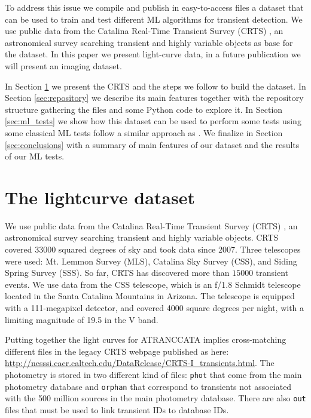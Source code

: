 \documentclass[a4paper,fleqn,usenatbib]{mnras}
\begin{document}
To address this issue we compile and publish in easy-to-access files a
dataset that can be used to train and test different ML algorithms for
transient detection.
We use public data from the Catalina Real-Time Transient Survey
(CRTS) \citep{1111.2566}, an astronomical survey searching transient
and highly variable objects as base for the dataset.
In this paper we present light-curve data, in a future publication we
will present an imaging dataset. 

In Section \ref{sec:data} we present the CRTS and the steps we follow
to build the dataset.
In Section \ref{sec:repository} we describe its main features together
with the repository structure gathering the files and some Python code  
to explore it.
In Section \ref{sec:ml_tests} we show how this dataset can be used to
perform some tests using some classical ML tests follow a similar
approach as \cite{1601.03931}.  
We finalize in Section \ref{sec:conclusions} with a summary of main
features of our dataset and the results of our ML tests.

\section{The lightcurve dataset} 
\label{sec:data}

We use public data from the Catalina Real-Time Transient Survey
(CRTS) \citep{2009ApJ...696..870D}, an astronomical survey searching transient
and highly variable objects.   
CRTS covered 33000 squared degrees of sky and took data since 2007.
Three telescopes were used: Mt. Lemmon Survey (MLS), Catalina Sky
Survey (CSS), and Siding Spring Survey (SSS). So far, CRTS has
discovered more than $15000$ transient events.
We use data from the CSS telescope, which is an f/1.8 Schmidt
telescope located in the Santa Catalina Mountains in Arizona.
The telescope is equipped with a 111-megapixel  detector, and covered
4000 square degrees per night, with a limiting magnitude of 19.5 in
the V band.  

Putting together the light curves for ATRANCCATA implies
cross-matching different files in the legacy CRTS webpage
published as here:
\url{http://nesssi.cacr.caltech.edu/DataRelease/CRTS-I_transients.html}. 
The photometry is stored in two different kind of files: \verb"phot"
that come from the main photometry database and \verb"orphan" that
correspond to transients not associated with the 500 million sources
in the main photometry database.
There are also \verb"out" files that must be used to link transient
IDs to database IDs.
\end{document}
